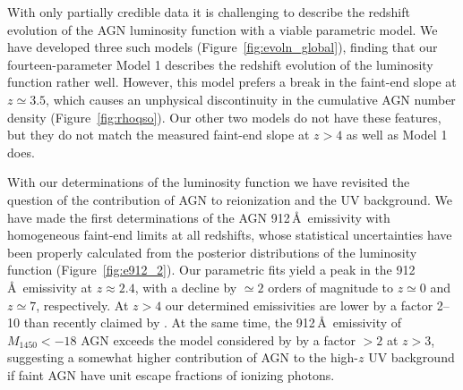 \documentclass[fleqn,usenatbib]{mnras}
\begin{document}
With only partially credible data it is challenging to describe the
redshift evolution of the AGN luminosity function with a viable
parametric model.  We have developed three such models
(Figure~\ref{fig:evoln_global}), finding that our fourteen-parameter
Model 1 describes the redshift evolution of the luminosity function
rather well.  However, this model prefers a break in the faint-end
slope at $z\simeq 3.5$, which causes an unphysical discontinuity in
the cumulative AGN number density (Figure~\ref{fig:rhoqso}).  Our
other two models do not have these features, but they do not match the
measured faint-end slope at $z>4$ as well as Model 1 does.

With our determinations of the luminosity function we have revisited
the question of the contribution of AGN to reionization and the UV
background.  We have made the first determinations of the AGN
912\,\AA\ emissivity with homogeneous faint-end limits at all
redshifts, whose statistical uncertainties have been properly
calculated from the posterior distributions of the luminosity function
(Figure~\ref{fig:e912_2}). Our parametric fits yield a peak in the
912\,\AA\ emissivity at $z\approx 2.4$, with a decline by $\simeq 2$
orders of magnitude to $z\simeq 0$ and $z\simeq 7$, respectively. At
$z>4$ our determined emissivities are lower by a factor 2--10 than
recently claimed by \citet{2015AA...578A..83G}. At the same time, the
912\,\AA\ emissivity of $M_{1450}<-18$ AGN exceeds the model
considered by \citet{2012ApJ...746..125H} by a factor $>2$ at $z>3$,
suggesting a somewhat higher contribution of AGN to the high-$z$ UV
background if faint AGN have unit escape fractions of ionizing
photons.
\end{document}
